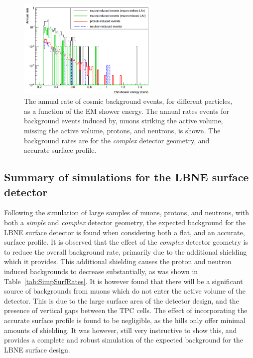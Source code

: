 \begin{figure}[h!]
  \centering
  \includegraphics[width=0.6\textwidth]{SurfEDistAllCuts}
  \caption[The annual rate of cosmic background events, for different particles, as a function of the EM shower energy]
          {The annual rate of cosmic background events, for different particles, as a function of the EM shower energy. The annual rates events for background events induced by, muons striking the active volume, missing the active volume, protons, and neutrons, is shown. The background rates are for the \emph{complex} detector geometry, and accurate surface profile.}
  \label{fig:SurfEDistCuts}
\end{figure}

\subsection{Summary of simulations for the LBNE surface detector}
Following the simulation of large samples of muons, protons, and neutrons, with both a \emph{simple} and \emph{complex} detector geometry, the expected background for the LBNE surface detector is found when considering both a flat, and an accurate, surface profile. It is observed that the effect of the \emph{complex} detector geometry is to reduce the overall background rate, primarily due to the additional shielding which it provides. This additional shielding causes the proton and neutron induced backgrounds to decrease substantially, as was shown in Table~\ref{tab:SimpSurfRates}. It is however found that there will be a significant source of backgrounds from muons which do not enter the active volume of the detector. This is due to the large surface area of the detector design, and the presence of vertical gaps between the TPC cells. The effect of incorporating the accurate surface profile is found to be negligible, as the hills only offer minimal amounts of shielding. It was however, still very instructive to show this, and provides a complete and robust simulation of the expected background for the LBNE surface design. \\


